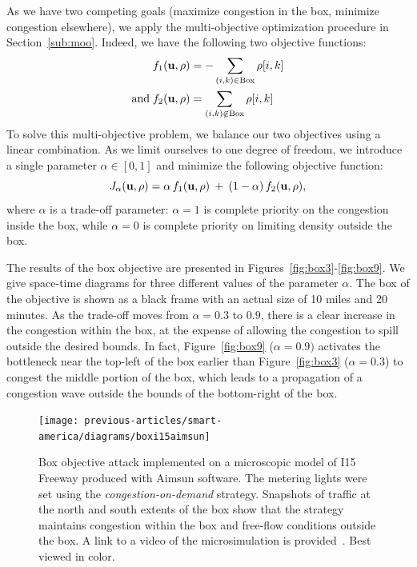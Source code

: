 As we have two competing goals (maximize congestion in the box, minimize congestion elsewhere), we apply the multi-objective optimization procedure in Section~\ref{sub:moo}. Indeed, we have the following two objective functions:
\begin{align}
	f_1 \left( \vectorize{u}, \vectorize{\rho} \right) & = - \sum_{(i,k) \in \text{Box}} \rho\left[i,k\right] \\ 
	\text{and} \; f_2 \left( \vectorize{u}, \vectorize{\rho} \right) & =  \sum_{(i,k) \not \in \text{Box}} \rho\left[i,k\right]
\end{align}
To solve this multi-objective problem, we balance our two objectives using a linear combination. As we limit ourselves to one degree of freedom, we introduce a single parameter $\alpha \in \left[0,1\right]$ and minimize the following objective function:
\begin{equation}
\label{eqn:alpha}
J_{\alpha} \left( \vectorize{u}, \vectorize{\rho} \right) = \alpha \, f_1 \left( \vectorize{u}, \vectorize{\rho} \right) \: + \: \left(1 - \alpha \right) \, f_2 \left( \vectorize{u}, \vectorize{\rho} \right),
\end{equation}
where $\alpha$ is a trade-off parameter: $\alpha = 1$ is complete priority on the congestion inside the box, while $\alpha = 0$ is complete priority on limiting density outside the box.


The results of the box objective are presented in Figures~\ref{fig:box3}-\ref{fig:box9}. We give space-time diagrams for three different values of the parameter $\alpha$. The box of the objective is shown as a black frame with an actual size of 10 miles and 20 minutes. As the trade-off moves from $\alpha=0.3$ to $0.9$, there is a clear increase in the congestion within the box, at the expense of allowing the congestion to spill outside the desired bounds. In fact, Figure~\ref{fig:box9} ($\alpha=0.9)$ activates the bottleneck near the top-left of the box earlier than Figure~\ref{fig:box3} ($\alpha=0.3$) to congest the middle portion of the box, which leads to a propagation of a congestion wave outside the bounds of the bottom-right of the box.

\begin{figure}
	\centering
	\texttt{[image: previous-articles/smart-america/diagrams/boxi15aimsun]}
	\caption[Box objective attack implemented on a microscopic model of I15 Freeway produced with Aimsun software.]{Box objective attack implemented on a microscopic model of I15 Freeway produced with Aimsun software.  The metering lights were set using the \emph{congestion-on-demand} strategy. Snapshots of traffic at the north and south extents of the box show that the strategy maintains congestion within the box and free-flow conditions outside the box. A link to a video of the microsimulation is provided~\cite{smartroadswebsite}. Best viewed in color.}
	\label{fig:boxi15aimsun}
\end{figure}

